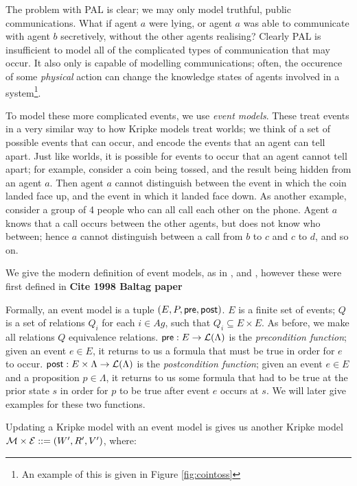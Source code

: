 \documentclass[10pt, a4paper]{report}
\begin{document}
The problem with PAL is clear; we may only model truthful, public
communications. What if agent $a$ were lying, or agent $a$ was able to
communicate with agent $b$ secretively, without the other agents realising?
Clearly PAL is insufficient to model all of the complicated types of
communication that may occur. It also only is capable of modelling
communications; often, the occurence of some \emph{physical} action can change
the knowledge states of agents involved in a system\footnote{An example of this
  is given in Figure \ref{fig:cointoss}}. 

To model these more complicated events, we use \emph{event models}. These
treat events in a very similar way to how Kripke models treat worlds; we think
of a set of possible events that can occur, and encode the events that an agent
can tell apart. Just like worlds, it is possible for events to occur that an
agent cannot tell apart; for example, consider a coin being tossed, and the
result being hidden from an agent $a$. Then agent $a$ cannot distinguish between
the event in which the coin landed face up, and the event in which it landed
face down. As another example, consider a group of 4 people who can all call
each other on the phone. Agent $a$ knows that a call occurs between the other
agents, but does not know who between; hence $a$ cannot distinguish between a
call from $b$ to $c$ and $c$ to $d$, and so on. 

We give the modern definition of event models, as in
\cite{MalvinThesis}, and \cite{AutomataTechniques}, however these were first
defined in \textbf{Cite 1998 Baltag paper}

Formally, an event model  is a tuple $(E, P, \textsf{pre}, \textsf{post})$. $E$ is a finite set
of events; $Q$ is a set of relations $Q_i$ for each $i \in Ag$, such that $Q_i
\subseteq E \times E$. As before, we make all relations $Q$ equivalence
relations. $\textsf{pre} : E \rightarrow \mathcal{L}(\Lambda) $ is the \emph{precondition
  function}; given an event $e \in E$, it returns to us a formula that must be
true in order for $e$ to occur. $\textsf{post} : E \times \Lambda \rightarrow
\mathcal{L}(\Lambda)$ is the \emph{postcondition function}; given an event $e \in
E$ and a proposition $p \in \Lambda$, it returns to us some formula that had to
be true at the prior state $s$ in order for $p$ to be true after event $e$
occurs at $s$. We will later give examples for these two functions. 

Updating a Kripke model  with an event model  is gives us another
Kripke model $\mathcal{M} \times \mathcal{E} ::= (W', R', V')$, where:
\end{document}
